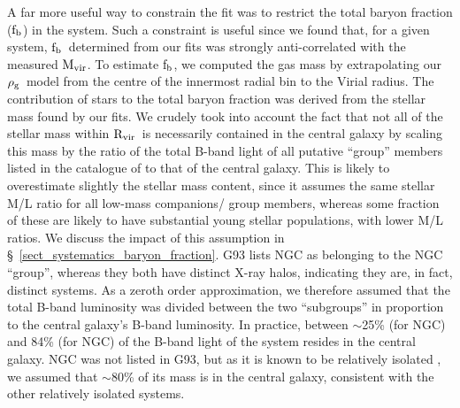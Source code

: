 \documentclass{emulateapj}
\newcommand{\rhog}{${\rm \rho_g}$}
\newcommand{\mvir}{${\rm M_{vir}}$}
\newcommand{\rvir }{${\rm R_{vir}}$}
\newcommand{\fbaryons}{${\rm f_{b}}$}
\newcommand{\thin}{\thinspace}
\begin{document}
A far more useful way to constrain the fit was to restrict the
total baryon fraction (\fbaryons) in the system.
Such a constraint is useful since we found that, for a given system,
\fbaryons\ determined from our fits was strongly anti-correlated with
the measured \mvir. To estimate \fbaryons, we 
computed the gas mass by extrapolating our \rhog\ model from the 
centre of the innermost radial bin to the Virial radius.
The contribution of stars to the total baryon fraction was derived
from the stellar mass found by our fits. 
We crudely took into account the fact that 
not all of the stellar mass within \rvir\ is necessarily 
contained in the central galaxy by scaling this mass by the ratio 
of the total B-band light of all putative ``group'' members listed
in the catalogue of  \citet[][hereafter G93]{garcia93} to that of the central galaxy.
This is likely to overestimate slightly the stellar mass content, since
it assumes the same stellar M/L ratio for all low-mass companions/ group
members, 
whereas some fraction of these are likely to have substantial young stellar
populations, with lower M/L ratios. 
We discuss the impact of this assumption in \S~\ref{sect_systematics_baryon_fraction}.
G93 lists NGC\thin 4649 as belonging to the NGC\thin 4472
``group'', whereas they both have distinct X-ray halos, indicating
they are, in fact, distinct systems. As a zeroth order approximation, we 
therefore assumed that the total B-band luminosity was divided between
the two ``subgroups'' in proportion to the central galaxy's B-band 
luminosity. In practice, between $\sim$25\% (for NGC\thin 4472) and
84\% (for NGC\thin 4125) of the B-band light of the system resides in the 
central galaxy. NGC\thin 6482 was not listed in G93,
but as it is known to be relatively isolated \citep{khosroshahi04a},
we assumed that $\sim$80\% of its mass is in the central galaxy, consistent
with the other relatively isolated systems.
\end{document}
